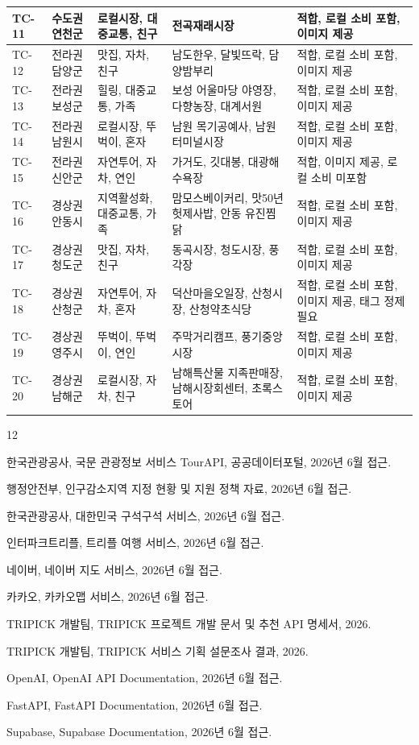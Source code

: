\documentclass[10pt,a4paper]{article}
\begin{document}
\begin{longtable}{|p{10mm}|p{18mm}|p{31mm}|p{58mm}|p{31mm}|}
\hline
TC-11 & 수도권 연천군 & 로컬시장, 대중교통, 친구 & 전곡재래시장 & 적합, 로컬 소비 포함, 이미지 제공 \\
\hline
TC-12 & 전라권 담양군 & 맛집, 자차, 친구 & 남도한우, 달빛뜨락, 담양밤부리 & 적합, 로컬 소비 포함, 이미지 제공 \\
\hline
TC-13 & 전라권 보성군 & 힐링, 대중교통, 가족 & 보성 어울마당 야영장, 다향농장, 대계서원 & 적합, 로컬 소비 포함, 이미지 제공 \\
\hline
TC-14 & 전라권 남원시 & 로컬시장, 뚜벅이, 혼자 & 남원 목기공예사, 남원 터미널시장 & 적합, 로컬 소비 포함, 이미지 제공 \\
\hline
TC-15 & 전라권 신안군 & 자연투어, 자차, 연인 & 가거도, 깃대봉, 대광해수욕장 & 적합, 이미지 제공, 로컬 소비 미포함 \\
\hline
TC-16 & 경상권 안동시 & 지역활성화, 대중교통, 가족 & 맘모스베이커리, 맛50년 헛제사밥, 안동 유진찜닭 & 적합, 로컬 소비 포함, 이미지 제공 \\
\hline
TC-17 & 경상권 청도군 & 맛집, 자차, 친구 & 동곡시장, 청도시장, 풍각장 & 적합, 로컬 소비 포함, 이미지 제공 \\
\hline
TC-18 & 경상권 산청군 & 자연투어, 자차, 혼자 & 덕산마을오일장, 산청시장, 산청약초식당 & 적합, 로컬 소비 포함, 이미지 제공, 태그 정제 필요 \\
\hline
TC-19 & 경상권 영주시 & 뚜벅이, 뚜벅이, 연인 & 주막거리캠프, 풍기중앙시장 & 적합, 로컬 소비 포함, 이미지 제공 \\
\hline
TC-20 & 경상권 남해군 & 로컬시장, 자차, 친구 & 남해특산물 지족판매장, 남해시장회센터, 초록스토어 & 적합, 로컬 소비 포함, 이미지 제공 \\
\hline
\end{longtable}

\normalsize
\renewcommand{\arraystretch}{1.0}

\begin{thebibliography}{12}

한국관광공사, 국문 관광정보 서비스 TourAPI, 공공데이터포털, 2026년 6월 접근.

행정안전부, 인구감소지역 지정 현황 및 지원 정책 자료, 2026년 6월 접근.

한국관광공사, 대한민국 구석구석 서비스, 2026년 6월 접근.

인터파크트리플, 트리플 여행 서비스, 2026년 6월 접근.

네이버, 네이버 지도 서비스, 2026년 6월 접근.

카카오, 카카오맵 서비스, 2026년 6월 접근.

TRIPICK 개발팀, TRIPICK 프로젝트 개발 문서 및 추천 API 명세서, 2026.

TRIPICK 개발팀, TRIPICK 서비스 기획 설문조사 결과, 2026.

OpenAI, OpenAI API Documentation, 2026년 6월 접근.

FastAPI, FastAPI Documentation, 2026년 6월 접근.

Supabase, Supabase Documentation, 2026년 6월 접근.

\end{thebibliography}
\end{document}
